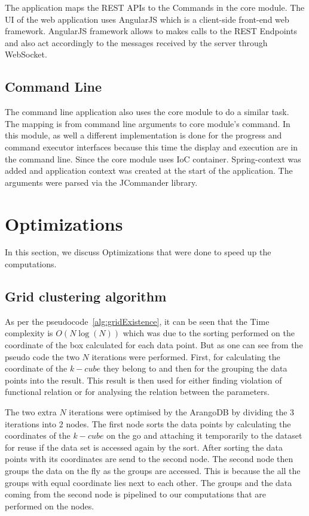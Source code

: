 The application maps the REST APIs to the Commands in the core module. The UI of the web application uses AngularJS which is a client-side front-end web framework. AngularJS framework allows to makes calls to the REST Endpoints and also act accordingly to the messages received by the server through WebSocket.

\subsection{Command Line}

The command line application also uses the core module to do a similar task. The mapping is from command line arguments to core module's command. In this module, as well a different implementation is done for the progress and command executor interfaces because this time the display and execution are in the command line. Since the core module uses IoC container. Spring-context was added and application context was created at the start of the application. The arguments were parsed via the JCommander library. 

\section{Optimizations}

In this section, we discuss Optimizations that were done to speed up the computations.

\subsection{Grid clustering algorithm}

As per the pseudocode~\ref{alg:gridExistence}, it can be seen that the Time complexity is \(O(N\log(N))\) which was due to the sorting performed on the coordinate of the box calculated for each data point. But as one can see from the pseudo code the two \(N\) iterations were performed. First, for calculating the coordinate of the \(k-cube\) they belong to and then for the grouping the data points into the result. This result is then used for either finding violation of functional relation or for analysing the relation between the parameters. 

The two extra \(N\) iterations were optimised by the ArangoDB by dividing the 3 iterations into 2 nodes. The first node sorts the data points by calculating the coordinates of the \(k-cube\) on the go and attaching it temporarily to the dataset for reuse if the data set is accessed again by the sort. After sorting the data points with its coordinates are send to the second node. The second node then groups the data on the fly as the groups are accessed. This is because the all the groups with equal coordinate lies next to each other. The groups and the data coming from the second node is pipelined to our computations that are performed on the nodes. 

